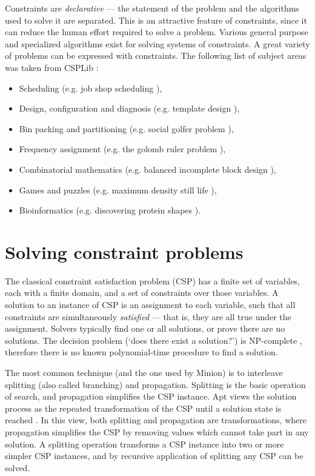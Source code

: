 \documentclass[oneside]{book}
\begin{document}
Constraints are \emph{declarative} --- the statement of the problem
and the algorithms used to solve it are separated. This is an attractive
feature of constraints, since it can reduce the human effort required
to solve a problem. Various general purpose and specialized algorithms
exist for solving systems of constraints. A great variety of problems
can be expressed with constraints. The following list of subject areas
was taken from CSPLib \cite{csplib}:

\begin{itemize}
\item Scheduling (e.g. job shop scheduling \cite{martin-jobshop-96new}),
\item Design, configuration and diagnosis (e.g. template design \cite{proll-smith-templatedesign}),
\item Bin packing and partitioning (e.g. social golfer problem \cite{harvey01symmetry}),
\item Frequency assignment (e.g. the golomb ruler problem \cite{smith99golomb}),
\item Combinatorial mathematics (e.g. balanced incomplete block design \cite{frisch-symmetry-implied-04}),
\item Games and puzzles (e.g. maximum density still life \cite{smith-model-life}), 
\item Bioinformatics (e.g. discovering protein shapes \cite{protein-structure-problems}).
\end{itemize}

\section{Solving constraint problems}

The classical constraint satisfaction problem (CSP) has a finite set
of variables, each with a finite domain, and a set of constraints
over those variables. A solution to an instance of CSP is an assignment
to each variable, such that all constraints are simultaneously \emph{satisfied}
--- that is, they are all true under the assignment. Solvers typically
find one or all solutions, or prove there are no solutions. The decision
problem (`does there exist a solution?') is NP-complete \cite{apt-constraint-programming},
therefore there is no known polynomial-time procedure to find a solution.

The most common technique (and the one used by Minion) is to interleave
splitting (also called branching) and propagation. Splitting is the
basic operation of search, and propagation simplifies the CSP instance.
Apt views the solution process as the repeated transformation of the
CSP until a solution state is reached \cite{apt-constraint-programming}.
In this view, both splitting and propagation are transformations,
where propagation simplifies the CSP by removing values which cannot
take part in any solution. A splitting operation transforms a CSP
instance into two or more simpler CSP instances, and by recursive
application of splitting any CSP can be solved. 
\end{document}

